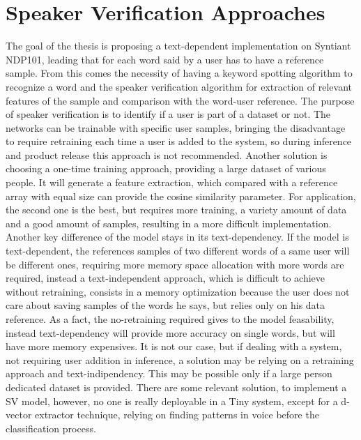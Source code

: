 \section{Speaker Verification Approaches}
\label{subsec:sv approaches}
The goal of the thesis is proposing a text-dependent implementation on Syntiant NDP101, leading that for each word said by a user has to have a reference sample. From this comes the necessity of having a keyword spotting algorithm to recognize a word and the speaker verification algorithm for extraction of relevant features of the sample and comparison with the word-user reference.\newline\newline
The purpose of speaker verification is to identify if a user is part of a dataset or not. The networks can be trainable with specific user samples, bringing the disadvantage to require retraining each time a user is added to the system, so during inference and product release this approach is not recommended. Another solution is choosing a one-time training approach, providing a large dataset of various people. It will generate a feature extraction, which compared with a reference array with equal size can provide the cosine similarity parameter. For application, the second one is the best, but requires more training, a variety amount of data and a good amount of samples, resulting in a more difficult implementation. Another key difference of the model stays in its text-dependency. If the model is text-dependent, the references samples of two different words of a same user will be different ones, requiring more memory space allocation with more words are required, instead a text-independent approach, which is difficult to achieve without retraining, consists in a memory optimization because the user does not care about saving samples of the words he says, but relies only on his data reference. As a fact, the no-retraining required gives to the model feasability, instead text-dependency will provide more accuracy on single words, but will have more memory expensives. It is not our case, but if dealing with a system, not requiring user addition in inference, a solution may be relying on a retraining approach and text-indipendency. This may be possible only if a large person dedicated dataset is provided. There are some relevant solution, to implement a SV model, however, no one is really deployable in a Tiny system, except for a d-vector extractor technique, relying on finding patterns in voice before the classification process.\cite{dvector_extractor_TinySV}\newline 

